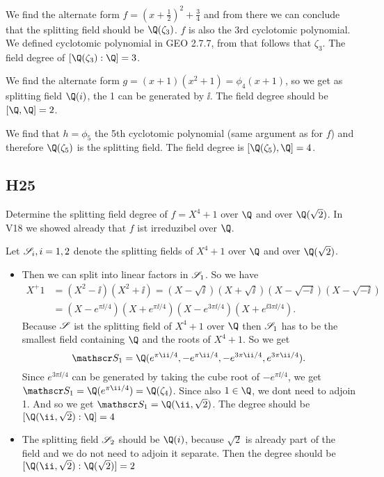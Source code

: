 \begin{solution}
		\item We find the alternate form $f = (x+\frac{1}{2})^2 + \frac{3}{4}$ and from there we can conclude that the 	splitting field should be $\Q(\zeta_3)$. $f$ is also the 3rd cyclotomic polynomial. We defined cyclotomic polynomial in GEO 2.7.7, from that follows that $\zeta_3$. The field degree of $[\Q(\zeta_3):\Q] = 3$.
		\item We find the alternate form $g = (x+1)(x^2 +1) = \phi_4(x+1)$, so we get as splitting field $\Q(i)$, the 1 can be generated by $\ii$. The field degree should be $[\Q, \Q] = 2$.
		\item We find that $h = \phi_5$ the 5th cyclotomic polynomial (same argument as for $f$) and therefore $\Q(\zeta_5)$ is the splitting field. The field degree is $[\Q(\zeta_5), \Q] = 4$.
\end{solution}

\subsection{H25}
Determine the splitting field degree of $f = X^4 + 1$ over $\Q$ and over $\Q(\sqrt{2})$. In V18 we showed already that $f$ ist irreduzibel over $\Q$.
\begin{solution}
	Let $\mathscr S_i, i =1,2$ denote the splitting fields of $X^4 +1$ over $\Q$ and over $\Q(\sqrt{2})$.
	\begin{itemize}
		\item Then we can split into linear factors in $\mathscr S_1$.
		So we have
		\begin{align*}
		X^ +1 &= (X^2 -\ii)(X^2 +\ii) = (X - \sqrt{\ii})(X+ \sqrt{\ii})(X- \sqrt{-\ii})(X- \sqrt{-\ii})\\
		&= (X-e^{\pi\ii /4})(X+e^{\pi\ii /4})(X-e^{3\pi\ii/4})(X+e^{\ii 3\pi\ii/4}).
		\end{align*}
		Because $\mathscr S$ ist the splitting field of $X^4 +1$ over $\Q$ then $\mathscr S_1$ has to be the smallest field containing $\Q$ and the roots of $X^4 +1$. So we get
		\[
		\Split_1 = \Q(e^{\pi\ii /4}, -e^{\pi\ii /4}, -e^{3\pi\ii/4}, e^{3\pi\ii/4}).
		\]
		Since $e^{3\pi\ii/4}$ can be generated by taking the cube root of $-e^{\pi\ii/4}$, we get $\Split_1 = \Q(e^{\pi\ii/4}) = \Q(\zeta_4)$. Since also $1 \in \Q$, we dont need to adjoin 1. And so we get $\Split_1 = \Q(\ii, \sqrt{2})$. The degree should be $[\Q(\ii, \sqrt{2}):\Q] = 4$
		\item The splitting field $\mathscr S_2$ should be $\Q(i)$, because $\sqrt{2}$ is already part of the field and we do not need to adjoin it separate. Then the degree should be $[\Q(\ii, \sqrt{2}):\Q(\sqrt{2})] = 2$ %
	\end{itemize}
\end{solution}